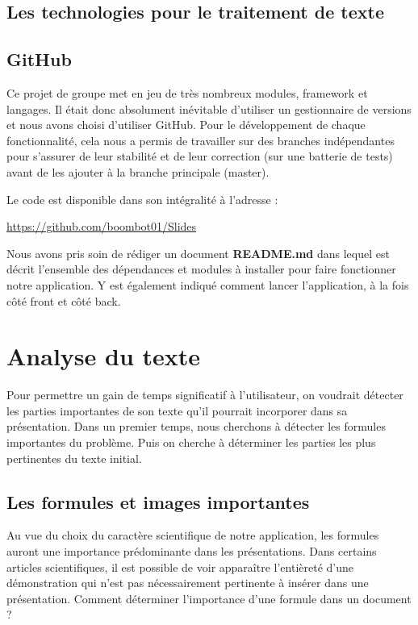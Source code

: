 \documentclass[12pt]{article}
\begin{document}
\subsection{Les technologies pour le traitement de texte}


\subsection{GitHub}
\noindent
Ce projet de groupe met en jeu de très nombreux modules, framework et langages. Il était donc absolument inévitable d'utiliser un gestionnaire de versions et nous avons choisi d'utiliser GitHub. Pour le développement de chaque fonctionnalité, cela nous a permis de travailler sur des branches indépendantes pour s'assurer de leur stabilité et de leur correction (sur une batterie de tests) avant de les ajouter à la branche principale (master).

\noindent
Le code est disponible dans son intégralité à l'adresse :

\begin{center}
\url{https://github.com/boombot01/Slides}
\end{center}

\noindent
Nous avons pris soin de rédiger un document \textbf{README.md} dans lequel est décrit l'ensemble des dépendances et modules à installer pour faire fonctionner notre application. Y est également indiqué comment lancer l'application, à la fois côté front et côté back.



\section{Analyse du texte}

\noindent
Pour permettre un gain de temps significatif à l'utilisateur, on voudrait détecter les parties importantes de son texte qu'il pourrait incorporer dans sa présentation. Dans un premier temps, nous cherchons à détecter les formules importantes du problème. Puis on cherche à déterminer les parties les plus pertinentes du texte initial.


\subsection{Les formules et images importantes}
\noindent
Au vue du choix du caractère scientifique de notre application, les formules auront une importance prédominante dans les présentations. Dans certains articles scientifiques, il est possible de voir apparaître l'entièreté d'une démonstration qui n'est pas nécessairement pertinente à insérer dans une présentation. Comment déterminer l'importance d'une formule dans un document ?
\end{document}
